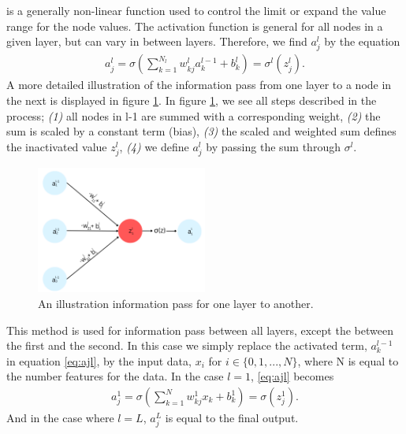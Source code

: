 is a generally non-linear function used to control the limit or expand the value range for the node values. The activation 
function is general for all nodes in a given layer, but can vary in between layers. Therefore,
we find $a_j^l$ by the equation
\begin{align}\label{eq:ajl}
    a_j^l = \sigma \left (\sum_{k=1} ^ {N_{l}} w_{kj}^la_k^{l-1} + b^l_k\right ) = \sigma^l(z_j^l).
\end{align}
A more detailed illustration of the information pass from one layer to a node in the next is displayed 
in figure \ref{fig:WB}. In figure \ref{fig:WB}, we see all steps described in the process; \emph{(1)} all nodes in 
l-1 are summed with a corresponding weight, \emph{(2)} the sum is scaled by a constant term (bias), \emph{(3)} the 
scaled and weighted sum defines the inactivated value $z_j^l$, \emph{(4)} we define $a^l_j$ by passing the 
sum through $\sigma^l$.  
\begin{figure}
    \centering
    \includegraphics[width=0.5\textwidth]{Figures/Illustrations/WeightBias.png}
    \caption{An illustration information pass for one layer to another.}
    \label{fig:WB}
\end{figure}
This method is used for information pass between all layers, except the between the first and the second. 
In this case we simply replace the activated term, $a_k^{l-1}$ in equation \ref{eq:ajl}, by the input data,
$x_i$ for $i\in\{0,1,...,N\}$, where N is equal to the number features for the data. In the case $l=1$, \ref{eq:ajl} 
becomes
\begin{align}
    a_j^1 = \sigma \left (\sum_{k=1} ^ {N} w_{kj}^1x_k + b^1_k\right ) = \sigma(z_j^1).
\end{align}
And in the case where $l=L$, $a_j^L$ is equal to the final output. 
